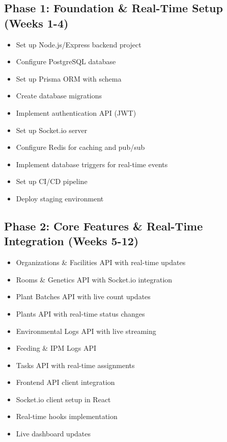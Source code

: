 \documentclass[11pt,a4paper]{article}
\begin{document}
\subsection{Phase 1: Foundation \& Real-Time Setup (Weeks 1-4)}
\begin{itemize}
    \item[$\square$] Set up Node.js/Express backend project
    \item[$\square$] Configure PostgreSQL database
    \item[$\square$] Set up Prisma ORM with schema
    \item[$\square$] Create database migrations
    \item[$\square$] Implement authentication API (JWT)
    \item[$\square$] Set up Socket.io server
    \item[$\square$] Configure Redis for caching and pub/sub
    \item[$\square$] Implement database triggers for real-time events
    \item[$\square$] Set up CI/CD pipeline
    \item[$\square$] Deploy staging environment
\end{itemize}

\subsection{Phase 2: Core Features \& Real-Time Integration (Weeks 5-12)}
\begin{itemize}
    \item[$\square$] Organizations \& Facilities API with real-time updates
    \item[$\square$] Rooms \& Genetics API with Socket.io integration
    \item[$\square$] Plant Batches API with live count updates
    \item[$\square$] Plants API with real-time status changes
    \item[$\square$] Environmental Logs API with live streaming
    \item[$\square$] Feeding \& IPM Logs API
    \item[$\square$] Tasks API with real-time assignments
    \item[$\square$] Frontend API client integration
    \item[$\square$] Socket.io client setup in React
    \item[$\square$] Real-time hooks implementation
    \item[$\square$] Live dashboard updates
\end{itemize}
\end{document}
